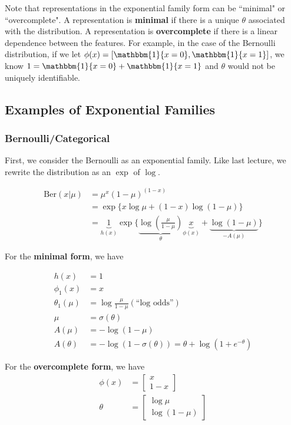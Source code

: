 \documentclass{article}
\begin{document}
\medskip

\noindent Note that representations in the exponential family form can be ``minimal" or ``overcomplete". A representation is \textbf{minimal} if there is a unique $\theta$ associated with the distribution. A representation is \textbf{overcomplete} if there is a linear dependence between the features. For example, in the case of the Bernoulli distribution, if we let $\phi(x) = [\mathbbm{1}\{x = 0\}, \mathbbm{1}\{x = 1\}]$, we know $1 = \mathbbm{1}\{x = 0\} + \mathbbm{1}\{x = 1\}$ and $\theta$ would not be uniquely identifiable.

\subsection{Examples of Exponential Families}

\subsubsection{Bernoulli/Categorical}
First, we consider the Bernoulli as an exponential family. Like last lecture, we rewrite the distribution as an $\exp$ of $\log$.

\begin{align*}    
\text{Ber}(x | \mu) &= \mu^x(1-\mu)^{(1-x)} \\
 &= \exp\{x\log \mu + (1-x)\log(1-\mu)\} \\
 &= \underbrace{1}_{h(x)}\exp\{\underbrace{\log\left(\frac{\mu }{1- \mu}\right)}_{\theta} \underbrace{x}_{\phi(x)} + \underbrace{\log (1- \mu)}_{-A(\mu)}\}
\end{align*}

For the \textbf{minimal form}, we have 

\begin{align*}
    h(x) &= 1 \\
    \phi_1(x) &= x \\
    \theta_1(\mu) &= \log\frac{\mu}{1 - \mu} (\text{``log odds''}) \\
    \mu &= \sigma(\theta)\\
    A(\mu) &= -\log(1-\mu)\\
    A(\theta) &= -\log(1-\sigma(\theta)) = \theta + \log(1+ e^{-\theta})
\end{align*}

For the \textbf{overcomplete form}, we have 
\begin{align*}
    \phi(x) &= \begin{bmatrix} x \\ 1 - x \end{bmatrix}\\
    \theta &= \begin{bmatrix} \log \mu \\ \log (1- \mu) \end{bmatrix}
\end{align*}
\end{document}
